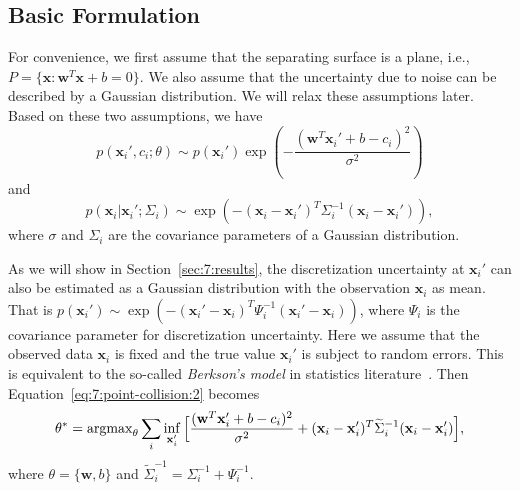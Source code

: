 \subsection{Basic Formulation}
\label{sec:7:algorithm:1}
For convenience, we first assume that the separating surface is a plane, i.e., $P = \{\mathbf x: \mathbf w^T \mathbf x + b = 0\}$. We also assume that the uncertainty due to noise can be described by a Gaussian distribution. We will relax these assumptions later.
Based on these two assumptions, we have
\begin{equation}
p(\mathbf x_i', c_i; \theta) \sim p(\mathbf x_i') \exp(-\frac{(\mathbf w^T \mathbf x_i' + b - c_i)^2}{\sigma^2}) 
\end{equation}
and
\begin{equation}
p(\mathbf x_i | \mathbf x_i'; \Sigma_i) \sim \exp(-(\mathbf x_i - \mathbf x_i')^T \Sigma_i^{-1} (\mathbf x_i - \mathbf x_i')),
\end{equation}
where $\sigma$ and $\Sigma_i$ are the covariance parameters of a Gaussian distribution.

As we will show in Section~\ref{sec:7:results}, the discretization uncertainty at $\mathbf x_i'$ can also be estimated as a Gaussian distribution with the observation $\mathbf x_i$ as mean. That is $p(\mathbf x_i') \sim \exp(-(\mathbf x_i' - \mathbf x_i)^T \Psi_i^{-1} (\mathbf x_i' - \mathbf x_i))$, where $\Psi_i$ is the covariance parameter for discretization uncertainty. Here we assume that the observed data $\mathbf x_i$ is fixed and the true value $\mathbf x_i'$ is subject to random errors. This is equivalent to the so-called \emph{Berkson's model} in statistics literature~\cite{Berkson:1950}.
Then Equation~\ref{eq:7:point-collision:2} becomes
\begin{equation}
\label{eq:7:point-collision:3}
\theta^* = \operatorname{argmax}_{\theta} \sum_i \inf_{\mathbf x_i'} \Big[\frac{(\mathbf w^T \mathbf x_i' + b - c_i)^2}{\sigma^2} + (\mathbf x_i - \mathbf x_i')^T \widetilde{\Sigma}_i^{-1} (\mathbf x_i - \mathbf x_i')\Big],
\end{equation}
where $\theta = \{\mathbf w, b\}$ and $\widetilde{\Sigma}_i^{-1} = \Sigma_i^{-1} + \Psi_i^{-1}$.

